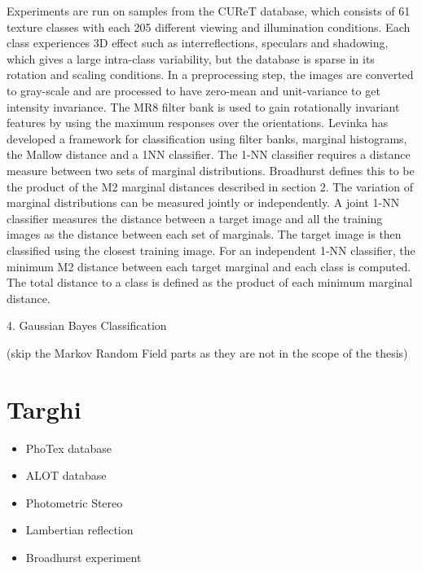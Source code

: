 Experiments are run on samples from the CUReT database, which consists of 61 texture classes with each 205 different viewing and illumination conditions. Each class experiences 3D effect such as interreflections, speculars and shadowing, which gives a large intra-class variability, but the database is sparse in its rotation and scaling conditions. In a preprocessing step, the images are converted to gray-scale and are processed to have zero-mean and unit-variance to get intensity invariance. The MR8 filter bank is used to gain rotationally invariant features by using the maximum responses over the orientations.
Levinka has developed a framework for classification using filter banks, marginal histograms, the Mallow distance and a 1NN classifier. The 1-NN classifier requires a distance measure between two sets of marginal distributions. Broadhurst defines this to be the product of the M2 marginal distances described in section 2. The variation of marginal distributions can be measured jointly or independently. A joint 1-NN classifier measures the distance between a target image and all the training images as the distance between each set of marginals. The target image is then classified using the closest training image. For an independent 1-NN classifier, the minimum M2 distance between each target marginal and each class is computed. The total distance to a class is defined as the product of each minimum marginal distance.



4. Gaussian Bayes Classification

(skip the Markov Random Field parts as they are not in the scope of the thesis)

\section{Targhi}\label{Targhi}
\begin{itemize}
	\item{PhoTex database}
	\item{ALOT database}
	\item{Photometric Stereo}
	\item{Lambertian reflection}
	\item{Broadhurst experiment}
\end{itemize}
